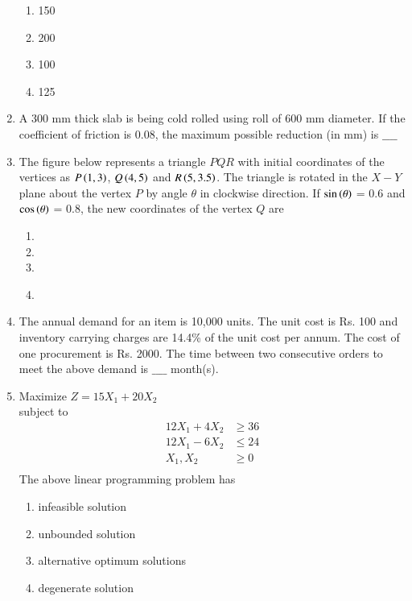 \documentclass[journal]{IEEEtran}
\begin{document}
\begin{enumerate}
\begin{enumerate}
    \item 150
    \item 200
    \item 100
    \item 125 \\
\end{enumerate}
\item A 300 mm thick slab is being cold rolled using roll of 600 mm diameter. If the coefficient of friction is 0.08, the maximum possible reduction (in mm) is $\_\_\_\_$ \\
\item The figure below represents a triangle $PQR$ with initial coordinates of the vertices as $P\left(1,3\right)$, $Q\left(4,5\right)$ and $R\left(5,3.5\right)$. The triangle is rotated in the $X-Y$ plane about the vertex $P$ by angle $\theta$ in
clockwise direction. If $\sin\left(\theta\right)$ = 0.6 and $\cos\left(\theta\right)$ = 0.8, the new coordinates of the vertex $Q$ are
\begin{figure}[!ht]
\centering
\resizebox{0.5\textwidth}{!}{%

}%
\end{figure}
  \begin{enumerate}
   \item {}
   \item {}
   \item {}
   \item {} \\
\end{enumerate}
\item The annual demand for an item is 10,000 units. The unit cost is Rs. 100 and inventory carrying charges are 14.4\% of the unit cost per annum. The cost of one procurement is Rs. 2000. The time between two consecutive orders to meet the above demand is $\_\_\_\_$ month(s). \\
\item Maximize $Z=15X_1 + 20X_2$ \\
subject to \\
\begin{align*}
    12X_1+ 4X_2 & \geq 36 \\
12X_1 - 6X_2 & \leq 24 \\
X_1, X_2 & \geq 0 \\
\end{align*}
The above linear programming problem has
\begin{enumerate}
    \item infeasible solution
    \item unbounded solution
    \item alternative optimum solutions
    \item degenerate solution \\
\end{enumerate}
			 \end{enumerate}
			 
\end{document}
